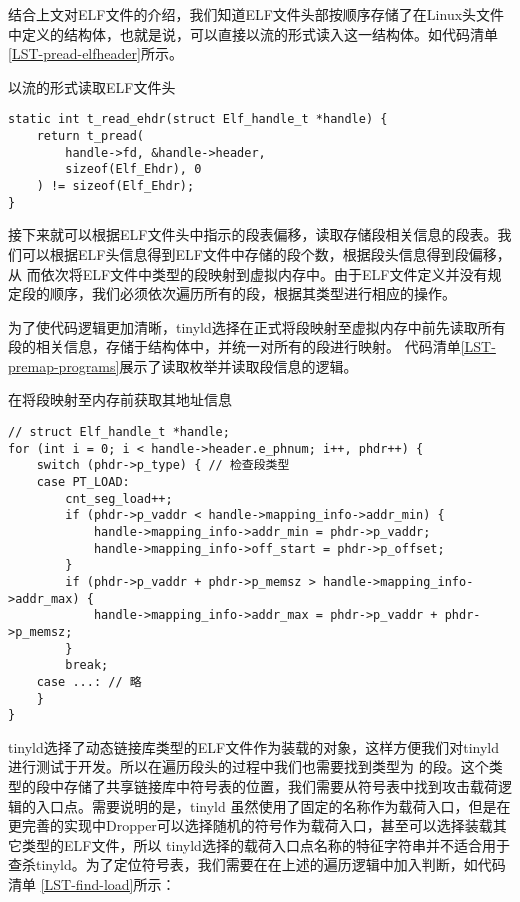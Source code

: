 结合上文对ELF文件的介绍，我们知道ELF文件头部按顺序存储了在Linux头文件中定义的结构体，也就是说，可以直接以流的形式读入这一结构体。如代码清单\ref{LST-pread-elfheader}所示。

\begin{listing}
\caption{以流的形式读取ELF文件头}
\label{LST-pread-elfheader}
\begin{verbatim}
static int t_read_ehdr(struct Elf_handle_t *handle) {
    return t_pread(
        handle->fd, &handle->header,
        sizeof(Elf_Ehdr), 0
    ) != sizeof(Elf_Ehdr);
}
\end{verbatim}
\end{listing}

接下来就可以根据ELF文件头中指示的段表偏移，读取存储段相关信息的段表。我们可以根据ELF头信息得到ELF文件中存储的段个数，根据段头信息得到段偏移，从
而依次将ELF文件中类型的段映射到虚拟内存中。由于ELF文件定义并没有规定段的顺序，我们必须依次遍历所有的段，根据其类型进行相应的操作。

为了使代码逻辑更加清晰，tinyld选择在正式将段映射至虚拟内存中前先读取所有段的相关信息，存储于结构体中，并统一对所有的段进行映射。
代码清单\ref{LST-premap-programs}展示了读取枚举并读取段信息的逻辑。

\begin{listing}
\caption{在将段映射至内存前获取其地址信息}
\label{LST-premap-programs}
\begin{verbatim}
// struct Elf_handle_t *handle;
for (int i = 0; i < handle->header.e_phnum; i++, phdr++) {
    switch (phdr->p_type) { // 检查段类型
    case PT_LOAD:
        cnt_seg_load++;
        if (phdr->p_vaddr < handle->mapping_info->addr_min) {
            handle->mapping_info->addr_min = phdr->p_vaddr;
            handle->mapping_info->off_start = phdr->p_offset;
        }
        if (phdr->p_vaddr + phdr->p_memsz > handle->mapping_info->addr_max) {
            handle->mapping_info->addr_max = phdr->p_vaddr + phdr->p_memsz;
        }
        break;
    case ...: // 略
    }
}
\end{verbatim}
\end{listing}

tinyld选择了动态链接库类型的ELF文件作为装载的对象，这样方便我们对tinyld进行测试于开发。所以在遍历段头的过程中我们也需要找到类型为
的段。这个类型的段中存储了共享链接库中符号表的位置，我们需要从符号表中找到攻击载荷逻辑的入口点。需要说明的是，tinyld
虽然使用了固定的名称作为载荷入口，但是在更完善的实现中Dropper可以选择随机的符号作为载荷入口，甚至可以选择装载其它类型的ELF文件，所以
tinyld选择的载荷入口点名称的特征字符串并不适合用于查杀tinyld。为了定位符号表，我们需要在在上述的遍历逻辑中加入判断，如代码清单
\ref{LST-find-load}所示：

